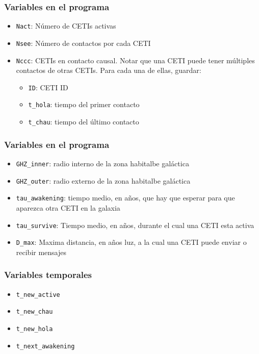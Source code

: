 \documentclass[handout]{beamer}
\theoremstyle{plain}
\theoremstyle{definition}
\theoremstyle{remark}
\begin{document}
\begin{frame}\frametitle{Variables en el programa}

   \begin{itemize}
      \item \texttt{Nact}: Número de CETIs activas
      \item \texttt{Nsee}: Número de contactos por cada CETI
      \item \texttt{Nccc}: CETIs en contacto causal.  Notar que una
         CETI puede tener múltiples contactos de otras CETIs.  Para
         cada una de ellas, guardar:
      \begin{itemize}
         \item \texttt{ID}: CETI ID
         \item \texttt{t\_hola}: tiempo del primer contacto
         \item \texttt{t\_chau}: tiempo del \'ultimo contacto
      \end{itemize}
   \end{itemize}

\end{frame}  %

\begin{frame}\frametitle{Variables en el programa}

   \begin{itemize}
      \item \texttt{GHZ\_inner}: radio interno de la zona habitalbe
         galáctica
      \item \texttt{GHZ\_outer}: radio externo de la zona habitalbe
         galáctica
      \item \texttt{tau\_awakening}:  tiempo medio, en años, que hay que esperar para que aparezca otra CETI en la galaxia 
      \item \texttt{tau\_survive}:  Tiempo medio, en años, durante el cual una CETI esta activa 
      \item \texttt{D\_max}: Maxima distancia, en años luz, a la cual una CETI puede enviar o recibir mensajes 
   \end{itemize}

\end{frame}  %


\begin{frame}\frametitle{Variables temporales}

   \begin{itemize}
      \item \texttt{t\_new\_active}
      \item \texttt{t\_new\_chau}
      \item \texttt{t\_new\_hola}
      \item \texttt{t\_next\_awakening}
   \end{itemize}

\end{frame}  %
\end{document}
